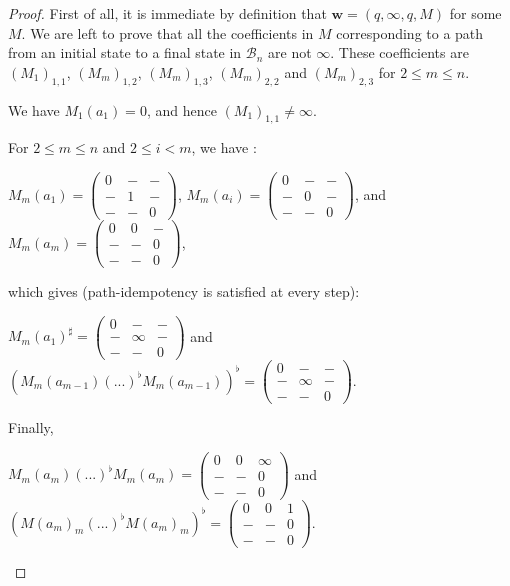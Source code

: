 \documentclass{lmcs}
\theoremstyle{remark}
\newcommand{\autB}{\mathcal{B}}
\theoremstyle{remark}
\begin{document}
\begin{proof}
First of all, it is immediate by definition that $\boldsymbol{w} = (q,\infty,q, M)$ for some $M$. We are left to prove that all the coefficients in $M$ corresponding to a path from an initial state to a final state in $\autB_n$ are not $\infty$. These coefficients are $(M_1)_{1,1}$, $(M_m)_{1,2}$, $(M_m)_{1,3}$, $(M_m)_{2,2}$  and $(M_m)_{2,3}$ for $2\leq m \leq n$.

We have $M_{1}(a_1)=0$, and hence $(M_{1})_{1,1} \neq \infty$.

For $2 \leq m \leq n$ and $2 \leq i < m$, we have : 
  \begin{center}
      $M_{m}(a_1) =  
      \begin{pmatrix}
          0 & - & - \\
          - & 1 & -\\
          - & - & 0
      \end{pmatrix}$, 
      $M_{m}(a_i) = 
      \begin{pmatrix}
          0 & - & - \\
          - & 0 & - \\
          - & - & 0
      \end{pmatrix}$, and
      $M_{m}(a_m) = 
      \begin{pmatrix}
          0 & 0 & - \\
          - & - & 0 \\
          - & - & 0
      \end{pmatrix}$, 
\end{center}

which gives (path-idempotency is satisfied at every step):

\begin{center}
      $M_{m}(a_1)^\sharp = 
      \begin{pmatrix}
          0 & - & - \\
          - & \infty & -\\
          - & - & 0
      \end{pmatrix}$ and
      $(M_{m}(a_{m-1})(...)^\flat M_{m}(a_{m-1}))^\flat= 
      \begin{pmatrix}
          0 & - & - \\
          - & \infty & -\\
          - & - & 0
      \end{pmatrix}$.
  \end{center}

Finally,
    \begin{center}
      $M_{m}(a_m)(...)^\flat M_{m}(a_m) = 
      \begin{pmatrix}
          0 & 0 & \infty \\
          - &- & 0\\
          - & - & 0
      \end{pmatrix}$ and
      $(M(a_{m})_{m}(...)^\flat M(a_{m})_{m})^\flat= 
      \begin{pmatrix}
          0 & 0 & 1 \\
          - & - & 0\\
          - & - & 0
      \end{pmatrix}$.
  \end{center} 


\end{proof}
\end{document}
